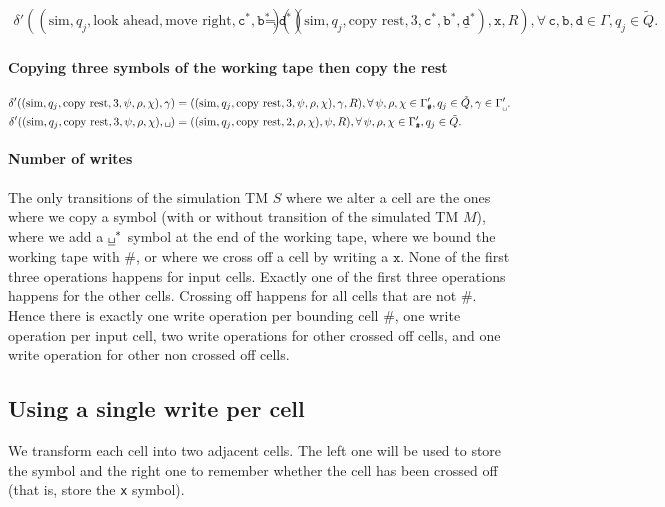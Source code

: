 \documentclass{article}
\newcommand{\obullet}[1]{\ensuremath{#1^*}}
\newcommand{\0}{\texttt{\textvisiblespace}}
\newcommand{\°}{\obullet{\0}}
\newcommand{\BB}{\obullet{\underline{\0}}}
\newcommand{\D}{\obullet{\d}}
\newcommand{\Q}{\obullet{\w}}
\renewcommand{\C}{\obullet{\y}}
\newcommand{\HD}{\obullet{\underline{\d}}}
\newcommand{\w}{\texttt{b}}
\newcommand{\y}{\texttt{c}}
\renewcommand{\d}{\texttt{d}}
\newcommand{\X}{\texttt{x}}
\newcommand{\e}{\texttt{\#}}
\newcommand{\TM}{TM}
\newcommand{\gpwb}{\Gamma'_{\0{}}}
\newcommand{\gpwe}{\Gamma'_{\e{}}}
\newcommand{\qwar}{\tilde{Q}}
\begin{document}
\begin{align}
  \delta'((\text{sim}, q_j, \text{look ahead}, \text{move right}, \C, \Q),\D)
  &=((\text{sim}, q_j, \text{copy rest}, 3, \C, \Q, \HD), \X, R),
  \forall\,
  \y,\w,\d \in \Gamma,
  q_j \in \qwar.
\end{align}

\paragraph{Copying three symbols of the working tape then copy the rest}
\begin{align}
  \delta'((\text{sim}, q_j, \text{copy rest}, 3, \psi, \rho, \chi), \gamma)
  &= ((\text{sim}, q_j, \text{copy rest}, 3, \psi, \rho, \chi),
  \gamma, R),
  \forall\,
  \psi,\rho,\chi \in \gpwe,
  q_j \in \qwar,
  \gamma \in \gpwb.\\
  \delta'((\text{sim}, q_j, \text{copy rest}, 3, \psi, \rho, \chi), \0{})
  &= ((\text{sim}, q_j, \text{copy rest}, 2, \rho, \chi), \psi, R),
  \forall\,
  \psi,\rho,\chi \in \gpwe,
  q_j \in \qwar.
\end{align}

\paragraph{Number of writes}
The only transitions of the simulation \TM{} $S$ where we alter a cell are the
ones where we
copy a symbol (with or without transition of the simulated \TM{} $M$), where we add a
$\BB$ symbol at the end of the working tape, where we bound the working tape
with $\e$, or where we cross off a cell by writing a $\X$.
None of the first three operations happens for input cells.
Exactly one of the first three operations happens for the other
cells.
Crossing off happens for all cells that are not $\e$. Hence there is exactly
one write operation per bounding cell $\e$,
one write operation per input cell,
two write operations for other crossed off cells,
and one write operation for other non crossed off cells.

\subsection{Using a single write per cell}

We transform each cell into two adjacent cells. The left one will be used to
store the symbol and the right one to remember whether the cell has been
crossed off (that is, store the \X{} symbol).
\end{document}
